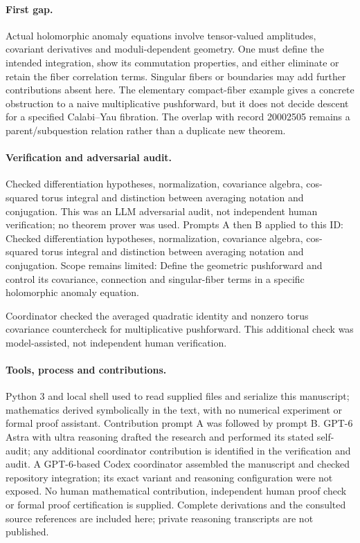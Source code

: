 \documentclass[11pt]{article}
\begin{document}
\paragraph{First gap.}Actual holomorphic anomaly equations involve tensor-valued amplitudes, covariant derivatives and moduli-dependent geometry. One must define the intended integration, show its commutation properties, and either eliminate or retain the fiber correlation terms. Singular fibers or boundaries may add further contributions absent here. The elementary compact-fiber example gives a concrete obstruction to a naive multiplicative pushforward, but it does not decide descent for a specified Calabi--Yau fibration. The overlap with record 20002505 remains a parent/subquestion relation rather than a duplicate new theorem.

\paragraph{Verification and adversarial audit.}
Checked differentiation hypotheses, normalization, covariance algebra, cos-squared torus integral and distinction between averaging notation and conjugation. This was an LLM adversarial audit, not independent human verification; no theorem prover was used. Prompts A then B applied to this ID: Checked differentiation hypotheses, normalization, covariance algebra, cos-squared torus integral and distinction between averaging notation and conjugation. Scope remains limited: Define the geometric pushforward and control its covariance, connection and singular-fiber terms in a specific holomorphic anomaly equation.

Coordinator checked the averaged quadratic identity and nonzero torus covariance countercheck for multiplicative pushforward. This additional check was model-assisted, not independent human verification.

\paragraph{Tools, process and contributions.}
Python 3 and local shell used to read supplied files and serialize this manuscript; mathematics derived symbolically in the text, with no numerical experiment or formal proof assistant. Contribution prompt A was followed by prompt B. GPT-6 Astra with ultra reasoning drafted the research and performed its stated self-audit; any additional coordinator contribution is identified in the verification and audit. A GPT-6-based Codex coordinator assembled the manuscript and checked repository integration; its exact variant and reasoning configuration were not exposed. No human mathematical contribution, independent human proof check or formal proof certification is supplied. Complete derivations and the consulted source references are included here; private reasoning transcripts are not published.
\end{document}
